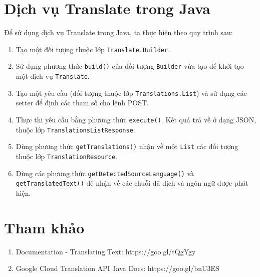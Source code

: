 \documentclass[../thesis.tex]{subfiles}
\begin{document}
\section{Dịch vụ Translate trong Java}
Để sử dụng dịch vụ Translate trong Java, ta thực hiện theo quy trình sau:
\begin{enumerate}
  \item Tạo một đối tượng thuộc lớp \lstinline{Translate.Builder}.
  \item Sử dụng phương thức \lstinline{build()} của đối tượng \lstinline{Builder} vừa tạo để khởi tạo một dịch vụ \lstinline{Translate}.
  \item Tạo một yêu cầu (đối tượng thuộc lớp \lstinline{Translations.List}) và sử dụng các setter để định các tham số cho lệnh POST.
  \item Thực thi yêu cầu bằng phương thức \lstinline{execute()}. Kết quả trả về ở dạng JSON, thuộc lớp \lstinline{TranslationsListResponse}.
  \item Dùng phương thức \lstinline{getTranslations()} nhận về một \lstinline{List} các đối tượng thuộc lớp \lstinline{TranslationResource}.
  \item Dùng các phương thức \lstinline{getDetectedSourceLanguage()} và \lstinline{getTranslatedText()} để nhận về các chuỗi đã dịch và ngôn ngữ được phát hiện.
\end{enumerate}

\section*{Tham khảo}

\begin{enumerate}
  \item Documentation - Translating Text: https://goo.gl/tQgYgy
  \item Google Cloud Translation API Java Docs: https://goo.gl/bnU3ES
\end{enumerate}
\end{document}
